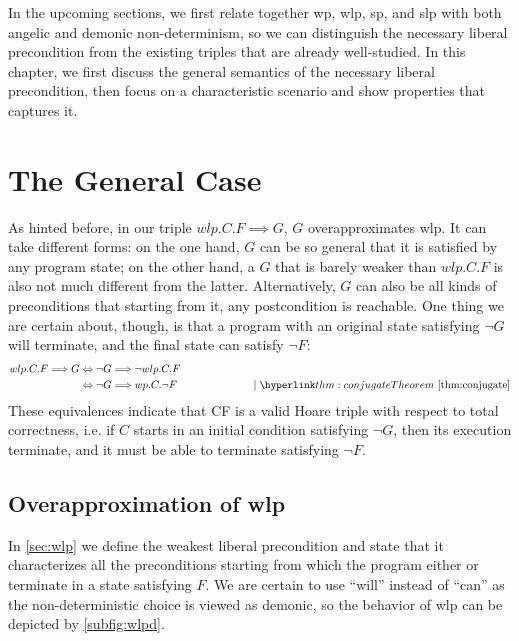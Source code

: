 In the upcoming sections, we first relate together wp, wlp, sp, and slp with both angelic and demonic non-determinism, so we can distinguish the necessary liberal precondition from the existing triples that are already well-studied. 
In this chapter, we first discuss the general semantics of the necessary liberal precondition, then focus on a characteristic scenario and show properties that captures it. 





\section{The General Case}\label{sec:general}
As hinted before, in our triple $wlp.C.F\implies G$, $G$ overapproximates wlp. 
It can take different forms: on the one hand, $G$ can be so general that it is satisfied by any program state; on the other hand, a $G$ that is barely weaker than $wlp.C.F$ is also not much different from the latter. 
Alternatively, $G$ can also be all kinds of preconditions that starting from it, any postcondition is reachable. 
One thing we are certain about, though, is that a program with an original state satisfying $\neg G$ will terminate, and the final state can satisfy $\neg F$: 
\begin{align*}
wlp.C.F{\implies} G & \Leftrightarrow \neg G {\implies} \neg wlp.C.F \\
	& \Leftrightarrow \neg G {\implies} wp.C.\neg F 
	\hspace{0.2\textwidth} \mid {\thm{conjugate}}
\end{align*}
These equivalences indicate that C{\neg F} is a valid Hoare triple with respect to total correctness, i.e. if $C$ starts in an initial condition satisfying $ \neg G$, then its execution  terminate, and it must be able to terminate satisfying $\neg F$. 

\subsection{Overapproximation of wlp}
In \autoref{sec:wlp} we define the weakest liberal precondition and state that it characterizes all the preconditions starting from which the program either  or  terminate in a state satisfying $F$. 
We are certain to use ``will'' instead of ``can'' as the non-deterministic choice is viewed as demonic, so the behavior of wlp can be depicted by \autoref{subfig:wlpd}. 

